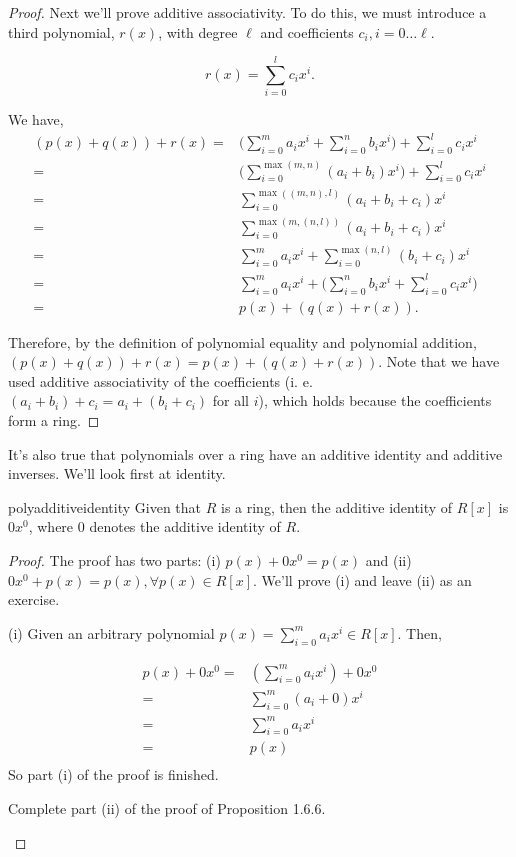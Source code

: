 \begin{proof}{}
Next we'll prove additive associativity. To do this, we must introduce a third polynomial, $r(x)$, with degree $\ell$ and coefficients $ c_i, i=0 \ldots \ell$.

\[r(x) = \sum^{l}_{i=0} c_ix^i.\]

We have,
\begin{align*}
(p(x)+q(x))+r(x) =& \bigg(\sum^{m}_{i=0} a_i x^i+\sum^{n}_{i=0} b_i x^i \bigg)+  \sum^{l}_{i=0} c_ix^i\\
=& \bigg(\sum_{i=0}^{\max(m,n)} (a_i + b_i) x^i\bigg)+  \sum^{l}_{i=0} c_ix^i\\
=& \sum_{i=0}^{\max((m,n),l)} (a_i + b_i+c_i) x^i\\
=& \sum_{i=0}^{\max(m,(n,l))} (a_i + b_i+c_i) x^i\\
=& \sum^{m}_{i=0} a_i x^i+\sum_{i=0}^{\max(n,l)} (b_i + c_i) x^i\\
=& \sum^{m}_{i=0} a_i x^i+\bigg(\sum^{n}_{i=0} b_i x^i+\sum^{l}_{i=0} c_i x^i \bigg)\\
=& p(x)+(q(x)+r(x)).
\end{align*}

Therefore, by the definition of polynomial equality and polynomial addition, $(p(x)+q(x))+r(x)=p(x)+(q(x)+r(x))$. Note that we have used additive associativity of the coefficients (i. e. $(a_i+b_i)+c_i=a_i+(b_i+c_i)$ for all $i$), which holds because the coefficients form a ring.  

\end {proof}

It's also true that polynomials over a ring have an additive identity and additive inverses. We'll look first at identity.

\begin{prop}{polyadditiveidentity}  Given that $R$ is a ring, then the additive identity of $R[x]$ is $0x^0$, where $0$ denotes the additive identity of $R$. 
\end{prop}

\begin{proof}
The proof has two parts:  (i) $p(x)+0x^0=p(x)$ and (ii) $0x^0+p(x)=p(x),  \forall p(x)   \in R[x]$. We'll prove (i) and leave (ii) as an exercise.

\noindent
(i) Given an arbitrary polynomial $p(x)= \sum^{m}_{i=0} a_i x^i \in R[x]$. Then,

\begin{align*}
p(x)+0x^0=&\left(\sum^{m}_{i=0} a_i x^i\right)+0x^0\\
=&\sum^{m}_{i=0} (a_i+0) x^i\\
=&\sum^{m}_{i=0} a_i x^i\\
=&p(x)\\
\end{align*}
So part (i) of the proof is finished.

\begin{exercise}{}
Complete part (ii) of the proof of Proposition 1.6.6.
\end{exercise}
\end{proof}

